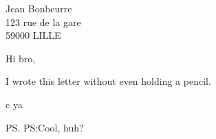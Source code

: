 \documentclass[12pt,a4paper,final]{lettre}
\begin{document}

\begin{letter}{Jean Bonbeurre\\
    123 rue de la gare\\
    59000 LILLE}
\francais

\date{October 21, 2015}

\opening{Hi bro,}

I wrote this letter without even holding a pencil.

\closing{c ya}

\ps{PS:}{Cool, huh?}

\end{letter}
\end{document}
